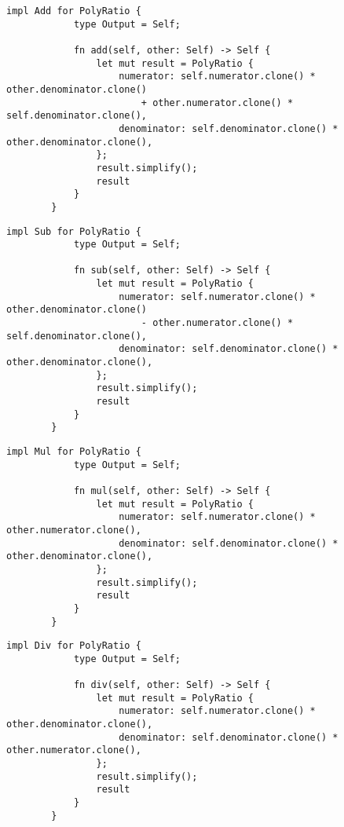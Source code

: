     \begin{lstlisting}[caption={The implementation of the addition operation for the \texttt{PolyRatio} struct}, label={lst:polyratio-add}]
        impl Add for PolyRatio {
            type Output = Self;
        
            fn add(self, other: Self) -> Self {
                let mut result = PolyRatio {
                    numerator: self.numerator.clone() * other.denominator.clone()
                        + other.numerator.clone() * self.denominator.clone(),
                    denominator: self.denominator.clone() * other.denominator.clone(),
                };
                result.simplify();
                result
            }
        }
    \end{lstlisting}
    
    \begin{lstlisting}[caption={The implementation of the subtraction operation for the \texttt{PolyRatio} struct}, label={lst:polyratio-sub}]
        impl Sub for PolyRatio {
            type Output = Self;
        
            fn sub(self, other: Self) -> Self {
                let mut result = PolyRatio {
                    numerator: self.numerator.clone() * other.denominator.clone()
                        - other.numerator.clone() * self.denominator.clone(),
                    denominator: self.denominator.clone() * other.denominator.clone(),
                };
                result.simplify();
                result
            }
        }
    \end{lstlisting}

    \begin{lstlisting}[caption={The implementation of the multiplication operation for the \texttt{PolyRatio} struct}, label={lst:polyratio-mul}]
        impl Mul for PolyRatio {
            type Output = Self;
        
            fn mul(self, other: Self) -> Self {
                let mut result = PolyRatio {
                    numerator: self.numerator.clone() * other.numerator.clone(),
                    denominator: self.denominator.clone() * other.denominator.clone(),
                };
                result.simplify();
                result
            }
        }
    \end{lstlisting}

    \begin{lstlisting}[caption={The implementation of the division operation for the \texttt{PolyRatio} struct}, label={lst:polyratio-div}]
        impl Div for PolyRatio {
            type Output = Self;
        
            fn div(self, other: Self) -> Self {
                let mut result = PolyRatio {
                    numerator: self.numerator.clone() * other.denominator.clone(),
                    denominator: self.denominator.clone() * other.numerator.clone(),
                };
                result.simplify();
                result
            }
        }
    \end{lstlisting}

